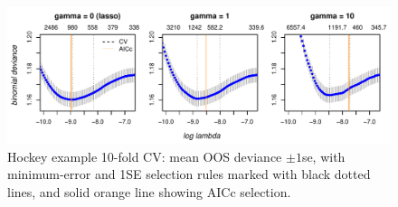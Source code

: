 \documentclass[12pt]{article}
\begin{document}
\begin{figure}[tb]
\includegraphics[width=6.3in]{nhl_cv}
\caption{\label{nhlcv} Hockey example 10-fold CV: mean OOS deviance $\pm 1$se, with minimum-error and 1SE selection rules marked with black dotted lines, and solid orange line showing AICc selection. }
\end{figure}
\end{document}
